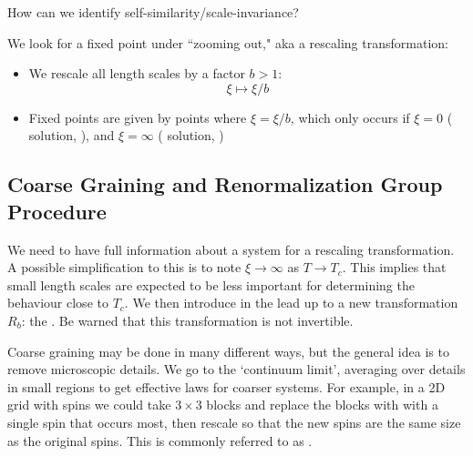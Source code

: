 \documentclass[12pt, a4paper, oneside, openright, titlepage]{book}
\begin{document}
\begin{qst}
    How can we identify self-similarity/scale-invariance?
\end{qst}

We look for a fixed point under ``zooming out," aka a rescaling transformation: \begin{itemize}
    \item We rescale all length scales by a factor $b > 1$: $$\xi \mapsto \xi/b$$
    \item Fixed points are given by points where $\xi = \xi/b$, which only occurs if $\xi = 0$ ( solution, ), and $\xi = \infty$ ( solution, )
\end{itemize}

\subsection{Coarse Graining and Renormalization Group Procedure}

We need to have full information about a system for a rescaling transformation. A possible simplification to this is to note $\xi\rightarrow \infty$ as $T\rightarrow T_c$. This implies that small length scales are expected to be less important for determining the behaviour close to $T_c$. We then introduce  in the lead up to a new transformation $R_b$: the . Be warned that this transformation is not invertible.

\begin{rmk}
    Coarse graining may be done in many different ways, but the general idea is to remove microscopic details. We go to the `continuum limit', averaging over details in small regions to get effective laws for coarser systems. For example, in a 2D grid with spins we could take $3\times 3$ blocks and replace the blocks with with a single spin that occurs most, then rescale so that the new spins are the same size as the original spins. This is commonly referred to as .
\end{rmk}
\end{document}
